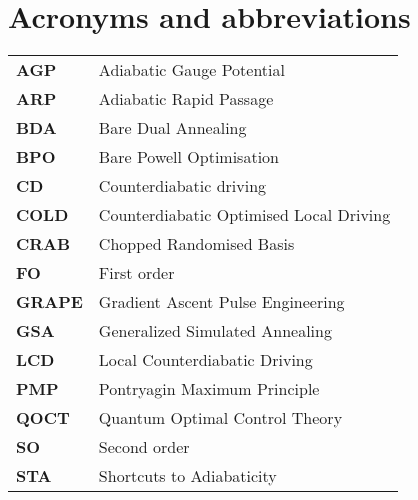 \chapter{Acronyms and abbreviations}

\begin{table}[h]
      \begin{tabular}{p{3cm}  p{8cm}}

        \textbf{AGP}\label{acr:AGP} & Adiabatic Gauge Potential \\ [7pt]
        \textbf{ARP}\label{acr:ARP} & Adiabatic Rapid Passage \\ [7pt]
        \textbf{BDA}\label{acr:BDA} & Bare Dual Annealing \\[7pt]
        \textbf{BPO}\label{acr:BPO} & Bare Powell Optimisation \\[7pt]
        \textbf{CD}\label{acr:CD} & Counterdiabatic driving \\[7pt]
        \textbf{COLD}\label{acr:COLD} & Counterdiabatic Optimised Local Driving \\[7pt]
        \textbf{CRAB}\label{acr:CRAB} & Chopped Randomised Basis \\ [7pt]
        \textbf{FO}\label{acr:FO} & First order \\ [7pt]
        \textbf{GRAPE}\label{acr:GRAPE} & Gradient Ascent Pulse Engineering \\ [7pt]
        \textbf{GSA}\label{acr:GSA} & Generalized Simulated Annealing \\ [7pt]
        \textbf{LCD}\label{acr:LCD} & Local Counterdiabatic Driving \\[7pt]
        \textbf{PMP}\label{acr:PMP} & Pontryagin Maximum Principle \\[7pt]
        \textbf{QOCT}\label{acr:QOCT} & Quantum Optimal Control Theory \\[7pt]
        \textbf{SO}\label{acr:SO} & Second order \\ [7pt]
        \textbf{STA}\label{acr:STA} & Shortcuts to Adiabaticity \\[7pt]

    \end{tabular}

\end{table}\label{table}